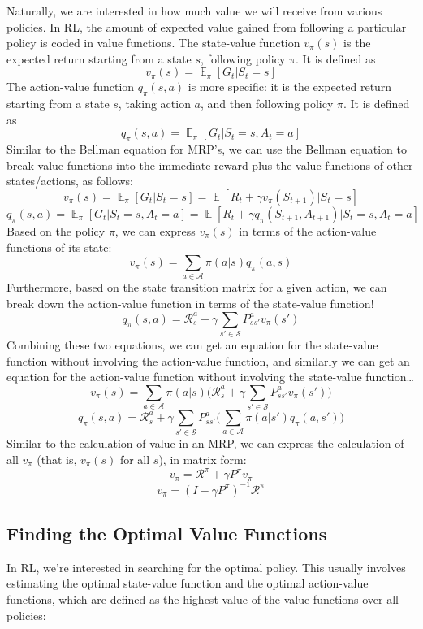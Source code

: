 \documentclass{article}
\DeclareMathOperator{\EX}{\mathbb{E}}
\begin{document}
Naturally, we are interested in how much value we will receive from various policies. In RL, the amount of expected value gained from following a particular policy is coded in value functions. The state-value function $v_\pi(s)$ is the expected return starting from a state $s$, following policy $\pi$. It is defined as
$$v_\pi(s) = \EX_\pi[G_t | S_t = s]$$
The action-value function $q_\pi(s, a)$ is more specific: it is the expected return starting from a state $s$, taking action $a$, and then following policy $\pi$. It is defined as
$$q_\pi(s, a) = \EX_\pi[G_t | S_t = s, A_t = a]$$
Similar to the Bellman equation for MRP’s, we can use the Bellman equation to break value functions into the immediate reward plus the value functions of other states/actions, as follows:
$$v_\pi(s) = \EX_\pi[G_t | S_t = s] = \EX[R_t + \gamma v_\pi(S_{t+1}) | S_t = s]$$
$$q_\pi(s, a) = \EX_\pi[G_t | S_t = s, A_t = a] = \EX[R_t + \gamma q_\pi(S_{t+1}, A_{t+1}) | S_t = s, A_t = a]$$
Based on the policy $\pi$, we can express $v_\pi(s)$ in terms of the action-value functions of its state:
$$v_\pi(s) = \sum_{a\in\mathcal{A}} \pi(a|s)q_\pi(a, s)$$
Furthermore, based on the state transition matrix for a given action, we can break down the action-value function in terms of the state-value function!
$$q_\pi(s, a) = \mathcal{R}^a_s + \gamma\sum_{s'\in\mathcal{S}}P^a_{ss'}v_\pi(s')$$
Combining these two equations, we can get an equation for the state-value function without involving the action-value function, and similarly we can get an equation for the action-value function without involving the state-value function…
$$v_\pi(s) = \sum_{a\in\mathcal{A}} \pi(a|s)\bigg(\mathcal{R}^a_s + \gamma\sum_{s'\in\mathcal{S}}P^a_{ss'}v_\pi(s')\bigg)$$
$$q_\pi(s, a) =  \mathcal{R}^a_s + \gamma\sum_{s'\in\mathcal{S}}P^a_{ss'}\bigg(\sum_{a\in\mathcal{A}} \pi(a|s')q_\pi(a, s')\bigg)$$
Similar to the calculation of value in an MRP, we can express the calculation of all $v_\pi$ (that is, $v_\pi(s)$ for all $s$), in matrix form:
$$v_\pi = \mathcal{R}^\pi + \gamma P^\pi v_\pi$$
$$v_\pi = (I - \gamma P^\pi)^{-1}\mathcal{R}^\pi$$

\subsection{Finding the Optimal Value Functions}

In RL, we're interested in searching for the optimal policy. This usually involves estimating the optimal state-value function and the optimal action-value functions, which are defined as the highest value of the value functions over all policies:
\end{document}
